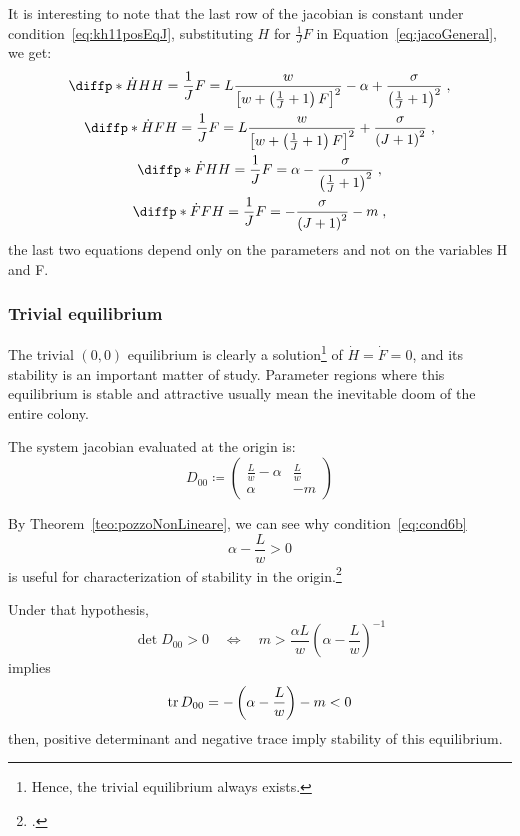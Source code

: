 It is interesting to note that the last row of the jacobian is constant under
condition~\eqref{eq:kh11posEqJ},
\ie substituting $H$ for $\frac{1}{J} F$ in Equation~\eqref{eq:jacoGeneral},
we get:
\begin{gather}
    \diffp*{ \dot{H} }{H}{H= \frac{1}{J} F} =
    L \frac{w}{ {\left[ w + \left( \frac{1}{J} +1 \right) F \right]}^2 } - \alpha
    + \frac{ \sigma }{ {\left( \frac{1}{J} + 1 \right)}^2 } \; ,
    \\
    \diffp*{ \dot{H} }{F}{H= \frac{1}{J} F} =
    L \frac{w}{ {\left[ w + \left( \frac{1}{J} +1 \right) F \right]}^2 }
    + \frac{ \sigma }{ {\left( J + 1 \right)}^2 } \; ,
    \\
    \diffp*{ \dot{F} }{H}{H= \frac{1}{J} F} =
    \alpha - \frac{ \sigma }{ {\left( \frac{1}{J} + 1 \right)}^2 } \; ,
    \\
    \diffp*{ \dot{F} }{F}{H= \frac{1}{J} F} =
    - \frac{ \sigma }{ {\left( J + 1 \right)}^2 } - m \; ,
    \label{eq:jacoOnJFH}
\end{gather}
the last two equations depend only on the parameters and not on the variables H and F.

\subsubsection{Trivial equilibrium}
The trivial $(0,0)$ equilibrium is clearly a solution\footnote{Hence, the trivial equilibrium always exists.}
of $\dot{H}=\dot{F}=0$, and its stability is an important matter of study. Parameter regions where this equilibrium is stable and attractive usually mean the inevitable doom of the entire colony.

The system jacobian evaluated at the origin is:
\begin{equation}
    D_{00} \coloneq
    \begin{pmatrix}
        \frac{L}{w} -\alpha &
        \frac{L}{w}
        \\
        \alpha & -m
    \end{pmatrix}
    \label{eq:jacoEquZero}
\end{equation}

By Theorem~\ref{teo:pozzoNonLineare}, we can see why
condition~\ref{eq:cond6b}
$$\alpha -\frac{L}{w}>0$$
is useful for characterization of stability in the origin.\footcite[3]{khoury2011}

Under that hypothesis,
$$\det  D_{00} > 0 \quad \iff \quad
m > \frac{\alpha L}{w} {\left( \alpha - \frac{L}{w} \right)}^{-1}$$
implies
$$\operatorname{tr} D_{00} = - \left( \alpha - \frac{L}{w} \right) - m < 0$$
then, positive determinant and negative trace imply stability of this equilibrium.


